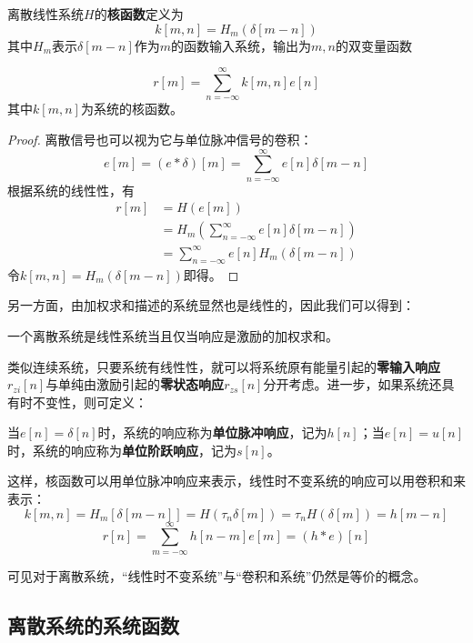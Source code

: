 \begin{definition}[离散线性系统的脉冲响应]
    离散线性系统$H$的\textbf{核函数}定义为
    $$k[m,n]=H_m(\delta[m-n])$$
    其中$H_m$表示$\delta[m-n]$作为$m$的函数输入系统，输出为$m,n$的双变量函数
\end{definition}

\begin{theorem}[叠加定理]
    \[r[m]=\sum_{n=-\infty}^{\infty}k[m,n]e[n]\]
    其中$k[m,n]$为系统的核函数。
\end{theorem}
\begin{proof}
    离散信号也可以视为它与单位脉冲信号的卷积：
    \[e[m]=(e*\delta)[m]=\sum_{n=-\infty}^{\infty}e[n]\delta[m-n]\]
    根据系统的线性性，有
    \begin{align*}
        r[m]&=H(e[m])\\
        &=H_m\left(\sum_{n=-\infty}^{\infty}e[n]\delta[m-n]\right)\\
        &=\sum_{n=-\infty}^{\infty}e[n]H_m(\delta[m-n])
    \end{align*}
    令$k[m,n]=H_m(\delta[m-n])$即得。
\end{proof}

另一方面，由加权求和描述的系统显然也是线性的，因此我们可以得到：
\begin{proposition}[离散线性系统的等价定义]
    一个离散系统是线性系统当且仅当响应是激励的加权求和。
\end{proposition}

类似连续系统，只要系统有线性性，就可以将系统原有能量引起的\textbf{零输入响应}$r_{zi}[n]$与单纯由激励引起的\textbf{零状态响应}$r_{zs}[n]$分开考虑。进一步，如果系统还具有时不变性，则可定义：
\begin{definition}[单位脉冲响应与单位阶跃响应]
    当$e[n]=\delta[n]$时，系统的响应称为\textbf{单位脉冲响应}，记为$h[n]$；当$e[n]=u[n]$时，系统的响应称为\textbf{单位阶跃响应}，记为$s[n]$。
\end{definition}

这样，核函数可以用单位脉冲响应来表示，线性时不变系统的响应可以用卷积和来表示：
\[k[m,n]=H_m[\delta[m-n]]=H(\tau_n \delta[m])=\tau_n H(\delta[m])=h[m-n]\]
\[r[n]=\sum_{m=-\infty}^{\infty}h[n-m]e[m]=(h*e)[n]\]

可见对于离散系统，“线性时不变系统”与“卷积和系统”仍然是等价的概念。

\subsection{离散系统的系统函数}\label{sub:discrete_system_function}

